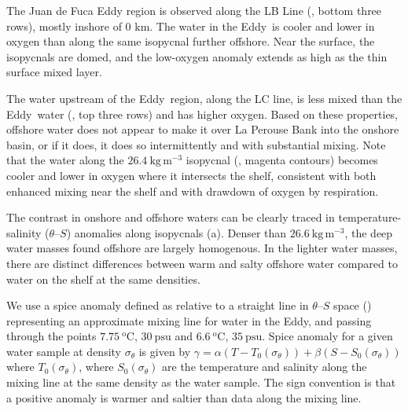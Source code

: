 \documentclass[draft]{agujournal2019}
\newcommand*{\Eddy}{{\sc Eddy}}
\begin{document}
The Juan de Fuca Eddy region is observed along the LB Line (, bottom three rows), mostly inshore of 0 km. The water in the \Eddy\ is cooler and lower in oxygen than along the same isopycnal further offshore.  Near the surface, the isopycnals are domed, and the low-oxygen anomaly extends as high as the thin surface mixed layer.

The water upstream of the \Eddy\ region, along the LC line, is less mixed than the \Eddy\ water (, top three rows) and has higher oxygen.  Based on these properties, offshore water does not appear to make it over La Perouse Bank into the onshore basin, or if it does, it does so intermittently and with substantial mixing. Note that the water along the $26.4\ \mathrm{kg\,m^{-3}}$ isopycnal (, magenta contours) becomes cooler and lower in oxygen where it intersects the shelf, consistent with both enhanced mixing near the shelf and with drawdown of oxygen by respiration.

The contrast in onshore and offshore waters can be clearly traced in temperature-salinity ($\theta$--$S$) anomalies along isopycnals (a).  Denser than $26.6\ \mathrm{kg\,m^{-3}}$, the deep water masses found offshore are largely homogenous. In the lighter water masses, there are distinct differences between warm and salty offshore water compared to water on the shelf at the same densities.

We use a spice anomaly defined as relative to a straight line in $\theta$--$S$
space () representing an approximate mixing line for
water in the \Eddy, and passing through the points $7.75\ \mathrm{^oC}$, $30\
\mathrm{psu}$ and $6.6\ \mathrm{^oC}$, $35\ \mathrm{psu}$. Spice anomaly for a
given water sample at density $\sigma_{\theta}$ is given by $\gamma = \alpha
\left(T - T_0\left(\sigma_{\theta}\right)\right) + \beta \left(S -
S_0\left(\sigma_{\theta}\right)\right)$ where
$T_0\left(\sigma_{\theta}\right)$, where $S_0\left(\sigma_{\theta}\right)$ are
the temperature and salinity along the mixing line at the same density as the
water sample. The sign convention is that a positive anomaly is warmer and
saltier than data along the mixing line.
\end{document}

